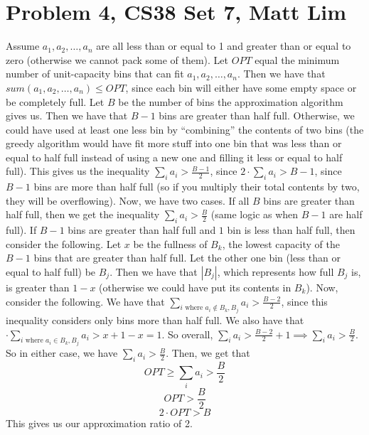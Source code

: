 \documentclass{article}
\begin{document}
\section*{Problem 4, CS38 Set 7, Matt Lim}
Assume $a_1, a_2, \dots, a_n$ are all less than or equal to 1 and greater than
or equal to zero (otherwise we cannot pack some of them).
Let $OPT$ equal the minimum number of unit-capacity bins that can fit $a_1, a_2, \dots, a_n$.
Then we have that $sum(a_1, a_2, \dots, a_n) \leq OPT$, since each bin will
either have some empty space or be completely full.
Let $B$ be the number of bins the approximation algorithm
gives us. Then we have that $B-1$ bins are greater than half full. Otherwise, we
could have used at least one less bin by ``combining'' the contents of two bins
(the greedy algorithm would have fit more stuff into one bin that was less than
or equal to half full instead of using a new one and filling it less or equal
to half full).
This gives us the inequality $\sum_i a_i > \frac{B-1}{2}$, since $2 \cdot \sum_i a_i
> B - 1$, since $B-1$ bins are more than half full (so if you multiply their
total contents by two, they will be overflowing). Now, we have two cases. If
all $B$ bins are greater than half full, then we get the inequality
$\sum_i a_i > \frac{B}{2}$ (same logic as when $B-1$ are half full).
If $B-1$ bins are greater than half full
and $1$ bin is less than half full, then consider the following. Let $x$ be the
fullness of $B_k$, the lowest capacity of the $B-1$ bins that are greater than half full.
Let the other one bin (less than or equal to half full) be $B_j$. Then we have
that $|B_j|$, which represents how full $B_j$ is, is
greater than $1-x$ (otherwise we could have put its contents in $B_k$). Now, consider the following.
We have that $\sum_{i \text{ where $a_i \notin B_k,B_j$}} a_i > \frac{B-2}{2}$,
since this inequality considers only bins more than half full. We also have that
$\cdot \sum_{i \text{ where $a_i \in B_k, B_j$}} a_i > x + 1 - x = 1$. So overall,
$\sum_{i} a_i > \frac{B-2}{2} + 1
\implies \sum_{i} a_i > \frac{B}{2}$. So in either case, we have $\sum_{i} a_i >
\frac{B}{2}$. Then, we get that
\[ OPT \geq \sum_i a_i > \frac{B}{2} \]
\[ OPT > \frac{B}{2} \]
\[ 2 \cdot OPT > B \]
This gives us our approximation ratio of 2.
\newpage

\end{document}
